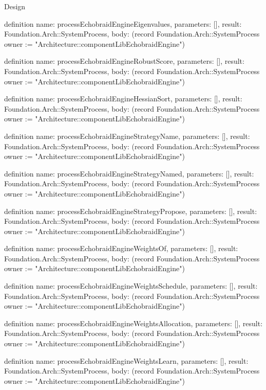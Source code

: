 \begin{lexlean}{Design}
\begin{semanticmodule}
definition{
  name: processEchobraidEngineEigenvalues,
  parameters: [],
  result: Foundation.Arch::SystemProcess,
  body: (record Foundation.Arch::SystemProcess {owner := "Architecture::componentLibEchobraidEngine"})
}

definition{
  name: processEchobraidEngineRobustScore,
  parameters: [],
  result: Foundation.Arch::SystemProcess,
  body: (record Foundation.Arch::SystemProcess {owner := "Architecture::componentLibEchobraidEngine"})
}

definition{
  name: processEchobraidEngineHessianSort,
  parameters: [],
  result: Foundation.Arch::SystemProcess,
  body: (record Foundation.Arch::SystemProcess {owner := "Architecture::componentLibEchobraidEngine"})
}

definition{
  name: processEchobraidEngineStrategyName,
  parameters: [],
  result: Foundation.Arch::SystemProcess,
  body: (record Foundation.Arch::SystemProcess {owner := "Architecture::componentLibEchobraidEngine"})
}

definition{
  name: processEchobraidEngineStrategyNamed,
  parameters: [],
  result: Foundation.Arch::SystemProcess,
  body: (record Foundation.Arch::SystemProcess {owner := "Architecture::componentLibEchobraidEngine"})
}

definition{
  name: processEchobraidEngineStrategyPropose,
  parameters: [],
  result: Foundation.Arch::SystemProcess,
  body: (record Foundation.Arch::SystemProcess {owner := "Architecture::componentLibEchobraidEngine"})
}

definition{
  name: processEchobraidEngineWeightsOf,
  parameters: [],
  result: Foundation.Arch::SystemProcess,
  body: (record Foundation.Arch::SystemProcess {owner := "Architecture::componentLibEchobraidEngine"})
}

definition{
  name: processEchobraidEngineWeightsSchedule,
  parameters: [],
  result: Foundation.Arch::SystemProcess,
  body: (record Foundation.Arch::SystemProcess {owner := "Architecture::componentLibEchobraidEngine"})
}

definition{
  name: processEchobraidEngineWeightsAllocation,
  parameters: [],
  result: Foundation.Arch::SystemProcess,
  body: (record Foundation.Arch::SystemProcess {owner := "Architecture::componentLibEchobraidEngine"})
}

definition{
  name: processEchobraidEngineWeightsLearn,
  parameters: [],
  result: Foundation.Arch::SystemProcess,
  body: (record Foundation.Arch::SystemProcess {owner := "Architecture::componentLibEchobraidEngine"})
}


\end{semanticmodule}
\end{lexlean}
